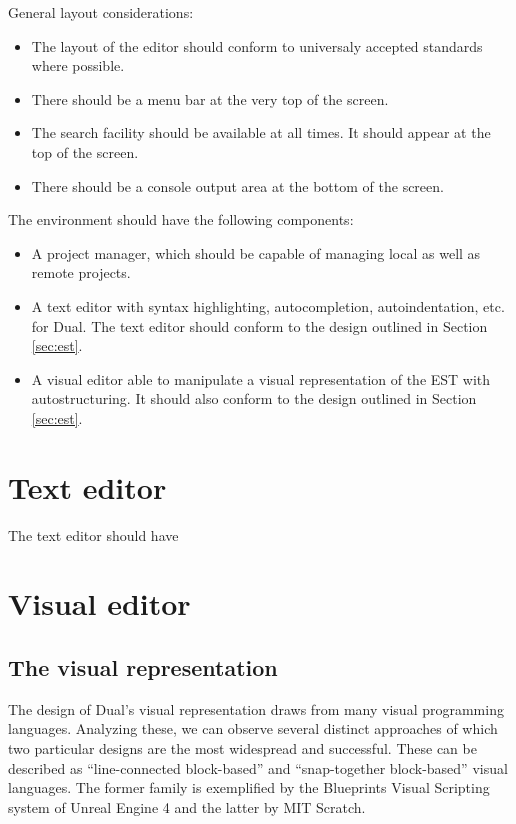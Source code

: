 General layout considerations:
\begin{itemize}
\item The layout of the editor should conform to universaly accepted standards where possible.
\item There should be a menu bar at the very top of the screen.
\item The search facility should be available at all times. It should appear at the top of the screen.
\item There should be a console output area at the bottom of the screen.
\end{itemize}



The environment should have the following components:
\begin{itemize}
\item A project manager, which should be capable of managing local as well as remote projects.
\item A text editor with syntax highlighting, autocompletion, autoindentation, etc. for Dual. The text editor should conform to the design outlined in Section \ref{sec:est}.
\item A visual editor able to manipulate a visual representation of the EST  with autostructuring. It should also conform to the design outlined in Section \ref{sec:est}.
\end{itemize}

\section{Text editor}
The text editor should have 

\section{Visual editor}

\subsection{The visual representation}
The design of Dual's visual representation draws from many visual programming
languages. Analyzing these, we can observe several distinct approaches of which two particular designs are the most widespread and successful. These can be
described as ``line-connected block-based'' and ``snap-together block-based''
visual languages. The former family is exemplified by the Blueprints Visual
Scripting system of Unreal Engine 4\cite{blueprint} and the latter by MIT Scratch\cite{scratch, scratch_wikipedia}.

